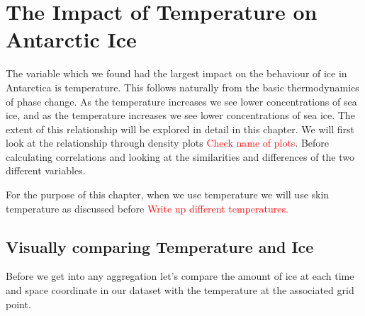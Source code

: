 \documentclass[../main.tex]{subfiles}
\begin{document}
\chapter[Temperature and Ice]{The Impact of Temperature on Antarctic Ice}

The variable which we found had the largest impact on the behaviour of ice in Antarctica is temperature. This follows naturally from the basic thermodynamics of phase change. As the temperature increases we see lower concentrations of sea ice, and as the temperature increases we see lower concentrations of sea ice. The extent of this relationship will be explored in detail in this chapter. We will first look at the relationship through density plots \textcolor{red}{Check name of plots}. Before calculating correlations and looking at the similarities and differences of the two different variables.

For the purpose of this chapter, when we use temperature we will use skin temperature as discussed before \textcolor{red}{Write up different temperatures.}


\section{Visually comparing Temperature and Ice}
Before we get into any aggregation let's compare the amount of ice at each time and space coordinate in our dataset with the temperature at the associated grid point. 
\end{document}
